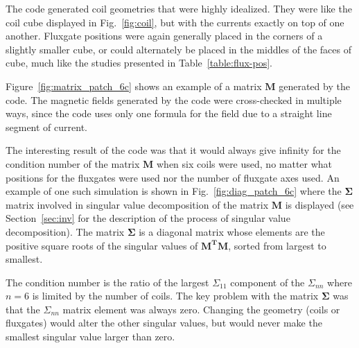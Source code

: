 The code generated coil geometries that were highly idealized.  They
were like the coil cube displayed in Fig.~\ref{fig:coil}, but with the
currents exactly on top of one another.  Fluxgate positions were again
generally placed in the corners of a slightly smaller cube, or could
alternately be placed in the middles of the faces of cube, much like
the studies presented in Table~\ref{table:flux-pos}.


Figure~\ref{fig:matrix_patch_6c} shows an example of a matrix $\bm{M}$
generated by the code.  The magnetic fields generated by the code were
cross-checked in multiple ways, since the code uses only one formula
for the field due to a straight line segment of current.

The interesting result of the code was that it would always give
infinity for the condition number of the matrix $\bm{M}$ when six
coils were used, no matter what positions for the fluxgates were used
nor the number of fluxgate axes used. An example of one such
simulation is shown in Fig.~\ref{fig:diag_patch_6c} where the
$\bm{\Sigma}$ matrix involved in singular value decomposition of the
matrix $\bm{M}$ is displayed (see Section~\ref{sec:inv} for the
description of the process of singular value decomposition).  The
matrix $\bm{\Sigma}$ is a diagonal matrix whose elements are the
positive square roots of the singular values of $\bm{M^T}\bm{M}$,
sorted from largest to smallest.


The condition number is the ratio of the largest $\Sigma_{11}$
component of the $\Sigma_{nn}$ where $n=6$ is limited by the number of
coils. The key problem with the matrix $\bm{\Sigma}$ was that the
$\Sigma_{nn}$ matrix element was always zero.  Changing the geometry
(coils or fluxgates) would alter the other singular values, but would
never make the smallest singular value larger than zero.


